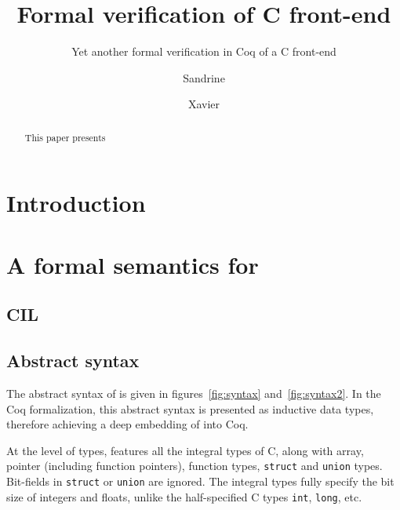 \documentclass[namedreferences]{kluwer}
\begin{document}
\begin{article}

\begin{opening}
\title{Formal verification of C front-end}
\subtitle{Yet another formal verification in Coq of a C front-end}

\author{Sandrine  }

\author{Xavier  }

\maketitle

\begin{abstract}
This paper presents
\end{abstract}

\end{opening}

\section{Introduction}

\section{A formal semantics for \Clight{}}
\subsection{CIL}

\subsection{Abstract syntax}

The abstract syntax of \Clight{} is given in figures~\ref{fig:syntax}
and~\ref{fig:syntax2}.
In the Coq formalization, this abstract syntax is presented as
inductive data types, therefore achieving a deep embedding of \Clight{}
into Coq.

At the level of types, \Clight{} features all the integral types of C,
along with array, pointer (including function pointers), function 
types, {\tt struct} and {\tt union} types. Bit-fields in {\tt struct} 
or {\tt union} are ignored.
The integral types fully specify the bit size of integers and floats, 
unlike the half-specified C types {\tt int}, {\tt long}, etc.  


\end{article}
\end{document}
